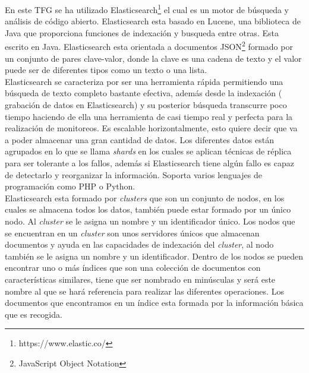 En este TFG se ha utilizado Elasticsearch\footnote{https://www.elastic.co/} el cual es un motor de búsqueda y análisis de código abierto. Elasticsearch esta basado en Lucene, una biblioteca de Java que proporciona funciones de indexación y busqueda entre otras. Esta escrito en Java. Elasticsearch esta orientada a documentos JSON\footnote{JavaScript Object Notation} formado por un conjunto de pares clave-valor, donde la clave es una cadena de texto y el valor puede ser de diferentes tipos como un texto o una lista.\cite{elastic}\\

Elasticsearch se caracteriza por ser una herramienta rápida permitiendo una búsqueda de texto completo bastante efectiva, además desde la indexación ( grabación de datos en Elasticsearch) y su posterior búsqueda transcurre poco tiempo haciendo de ella una herramienta de casi tiempo real y perfecta para la realización de monitoreos. Es escalable horizontalmente, esto quiere decir que va a poder almacenar una gran cantidad de datos. Los diferentes datos están agrupados en lo que se llama \textit{shards} en los cuales se aplican técnicas de réplica para ser tolerante a los fallos, además si Elasticsearch tiene algún fallo es capaz de detectarlo y reorganizar la información. Soporta varios lenguajes de programación como PHP o Python.\cite{elastic2}\\

Elasticsearch esta formado por \textit{clusters} que son un conjunto de nodos, en los cuales se almacena todos los datos, también puede estar formado por un único nodo. Al \textit{cluster} se le asigna un nombre y un identificador único. Los nodos que se encuentran en un \textit{cluster} son unos servidores únicos que almacenan documentos y ayuda en las capacidades de indexación del \textit{cluster}, al nodo también se le asigna un nombre y un identificador. Dentro de los nodos se pueden encontrar uno o más índices que son una colección de documentos con características similares, tiene que ser nombrado en minúsculas y será este nombre al que se hará referencia para realizar las diferentes operaciones. Los documentos que encontramos en un índice esta formada por la información básica que es recogida.\cite{elastic3}\\



